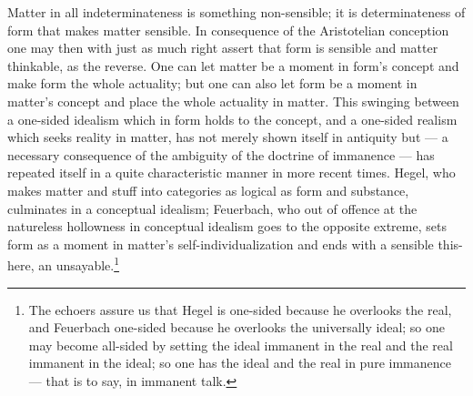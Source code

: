 \documentclass[12pt,a4paper]{book}
\begin{document}
Matter in all indeterminateness is something non-sensible; it is determinateness of form that makes matter
sensible. In consequence of the Aristotelian conception one may then with just as much right assert that form is
sensible and matter thinkable, as the reverse. One can let matter be a moment in form's concept and make form the
whole actuality; but one can also let form be a moment in matter's concept and place the whole actuality in
matter. This swinging between a one-sided idealism which in form holds to the concept, and a one-sided realism
which seeks reality in matter, has not merely shown itself in antiquity but --- a necessary consequence of the
ambiguity of the doctrine of immanence --- has repeated itself in a quite characteristic manner in more recent
times. Hegel, who makes matter and stuff into categories as logical as form and substance, culminates in a
conceptual idealism; Feuerbach, who out of offence at the natureless hollowness in conceptual idealism goes to
the opposite extreme, sets form as a moment in matter's self-individualization and ends with a sensible
this-here, an unsayable.\footnote{%
The echoers assure us that Hegel is one-sided because he overlooks the real, and Feuerbach one-sided because he
overlooks the universally ideal; so one may become all-sided by setting the ideal immanent in the real and the
real immanent in the ideal; so one has the ideal and the real in pure immanence --- that is to say, in immanent
talk.}
\end{document}
